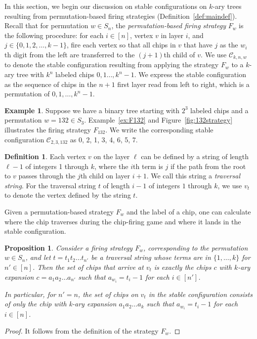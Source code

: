 \documentclass[final]{dmtcs-episciences}
\newtheorem{proposition}[theorem]{Proposition}
\theoremstyle{definition}
\newtheorem{definition}{Definition}%
\newtheorem{example}{Example}
\theoremstyle{remark}
\begin{document}
In this section, we begin our discussion on stable configurations on $k$-ary trees resulting from permutation-based firing strategies (Definition~\ref{def:maindef}). Recall that for permutation $w \in S_n$, the \textit{permutation-based firing strategy} $F_w$ is the following procedure: for each $i \in [n]$, vertex $v$ in layer $i$, and $j \in \{0, 1, 2, \dots, k-1\}$, fire each vertex so that all chips in $v$ that have $j$ as the $w_i$th digit from the left are transferred to the $(j+1)$th child of $v$. We use $\mathcal{C}_{k, n, w}$ to denote the stable configuration resulting from applying the strategy $F_w$ to a $k$-ary tree with $k^n$ labeled chips $0,1\dots, k^n-1$. We express the stable configuration as the sequence of chips in the $n+1$ first layer read from left to right, which is a permutation of $0, 1, \dots, k^n-1$.

\begin{example}
Suppose we have a binary tree starting with $2^3$ labeled chips and a permutation $w = 132 \in S_3$. Example~\ref{ex:F132} and Figure~\ref{fig:132strategy} illustrates the firing strategy $F_{132}$. We write the corresponding stable configuration $\mathcal{C}_{2,3,132}$ as 0, 2, 1, 3, 4, 6, 5, 7.
\end{example}

\begin{definition}
Each vertex $v$ on the layer $\ell$ can be defined by a string of length $\ell-1$ of integers 1 through $k$, where the $i$th term is $j$ if the path from the root to $v$ passes through the $j$th child on layer $i+1$. We call this string a \textit{traversal string}. For the traversal string $t$ of length $i-1$ of integers $1$ through $k$, we use $v_t$ to denote the vertex defined by the string $t$.
\end{definition}

Given a permutation-based strategy $F_w$ and the label of a chip, one can calculate where the chip traverses during the chip-firing game and where it lands in the stable configuration.

\begin{proposition}\label{prop:GeneralUnbundlingOperation}
Consider a firing strategy $F_w$, corresponding to the permutation $w \in S_n$, and let $t=t_1t_2\dots t_{n'}$ be a traversal string whose terms are in $\{1, \dots, k\}$ for $n' \in [n]$. Then the set of chips that arrive at $v_t$ is exactly the chips $c$ with $k$-ary expansion $c=a_1a_2\dots a_{n'}$ such that $a_{w_i} = t_i-1$ for each $i \in [n']$.

In particular, for $n'=n$, the set of chips on $v_t$ in the stable configuration consists of only the chip with k-ary expansion $a_1a_2\dots a_{k}$ such that $a_{w_i}=t_i-1$ for each $i \in [n]$.
\end{proposition}
\begin{proof}
    It follows from the definition of the strategy $F_w$.
\end{proof}
\end{document}
